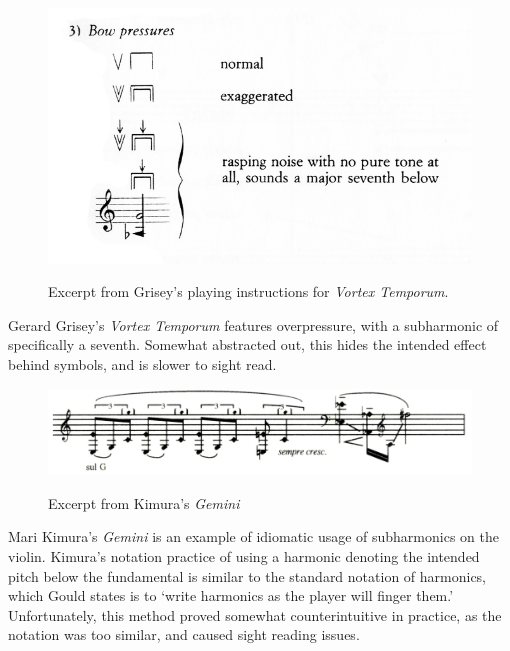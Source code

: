 \begin{figure}
    \includegraphics[width=\linewidth]{./resources/griseyVortexTemporum.jpg}
    \caption{Excerpt from Grisey's playing instructions for \emph{Vortex Temporum}.}
\label{fig:Excerpt from Grisey's playing instructions for Vortex Temporum}\autocite[]{griseyVortexTemporum}
  \end{figure}


Gerard Grisey's \emph{Vortex Temporum} features overpressure, with a subharmonic of specifically a seventh. 
Somewhat abstracted out, this hides the intended effect behind symbols, and is slower to sight read.

\begin{figure}
    \includegraphics[width=\linewidth]{./resources/kimura_gemini.png}
    \caption{Excerpt from Kimura's \emph{Gemini}}\autocite[]{kimuraGemini1992}
\label{fig:Excerpt from Kimura's Gemini}
  \end{figure}

  Mari Kimura's \emph{Gemini} is an example of idiomatic usage of subharmonics on the violin. 
  Kimura's notation practice of using a harmonic denoting the intended pitch below the fundamental is similar to the standard notation of harmonics, which Gould states is to `write harmonics as the player will finger them.'\autocite[413]{gouldBars2011} 
  Unfortunately, this method proved somewhat counterintuitive in practice, as the notation was too similar, and caused sight reading issues.

